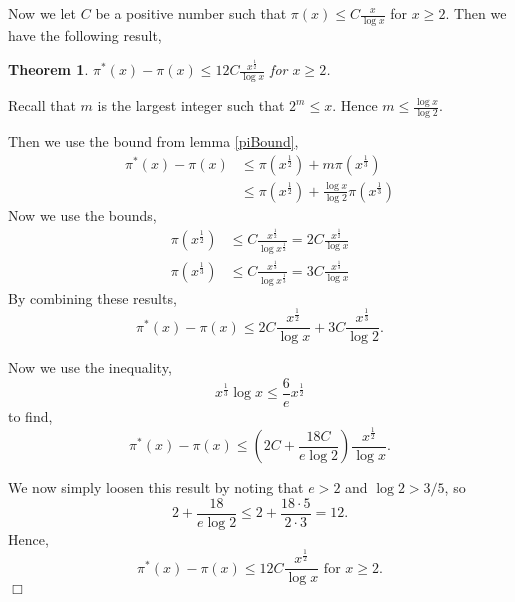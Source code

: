 \documentclass[10pt]{article}
\newtheorem{theorem}{Theorem}
\newenvironment{proof}[1][Proof]{\begin{trivlist}
\item[\hskip \labelsep {\bfseries #1}]}{\end{trivlist}}
\begin{document}
Now we let $C$ be a positive number such that $\pi(x) \leq C\frac{x}{\log{x}}$
for $x\geq 2$. Then we have the following result,
\begin{theorem}
    $\pi^*(x)-\pi(x)\leq 12C\frac{x^\frac{1}{2}}{\log{x}}$ for $x \geq 2$.
\end{theorem}
\begin{proof}
    Recall that $m$ is the largest integer such that $2^m\leq x$. Hence $m\leq \frac{\log{x}}{\log{2}}$.
    
    Then we use the bound from lemma \ref{piBound},
    \begin{align*}
        \pi^*(x)-\pi(x) &\leq \pi(x^\frac{1}{2}) + m\pi(x^\frac{1}{3})\\
         &\leq \pi(x^\frac{1}{2}) + \frac{\log{x}}{\log{2}}\pi(x^\frac{1}{3})
    \end{align*}
    Now we use the bounds,
    \begin{align*}
        \pi(x^\frac{1}{2}) &\leq C\frac{x^\frac{1}{2}}{\log{x^\frac{1}{2}}} = 2C\frac{x^\frac{1}{2}}{\log{x}}\\
        \pi(x^\frac{1}{3}) &\leq C\frac{x^\frac{1}{3}}{\log{x^\frac{1}{3}}} = 3C\frac{x^\frac{1}{3}}{\log{x}}
    \end{align*}
    By combining these results, 
    \begin{equation*}
        \pi^*(x)-\pi(x) \leq 2C\frac{x^\frac{1}{2}}{\log{x}}+3C\frac{x^\frac{1}{3}}{\log{2}}.
    \end{equation*}
    
    Now we use the inequality,
    \begin{equation*}
        x^\frac{1}{3}\log{x} \leq \frac{6}{e}x^\frac{1}{2}
    \end{equation*}
    to find,
    \begin{equation*}
        \pi^*(x)-\pi(x) \leq (2C+\frac{18C}{e\log{2}})\frac{x^\frac{1}{2}}{\log{x}}.
    \end{equation*}
    
    We now simply loosen this result by noting that $e>2$ and $\log{2}>3/5$, so
    \begin{equation*}
        2+\frac{18}{e\log{2}}\leq 2+\frac{18\cdot5}{2\cdot3} = 12.
    \end{equation*}
    Hence,
    \begin{equation*}
        \pi^*(x)-\pi(x)\leq 12C\frac{x^\frac{1}{2}}{\log{x}}\text{ for }x \geq 2.
    \end{equation*}
    $\Box$
\end{proof}
\end{document}
